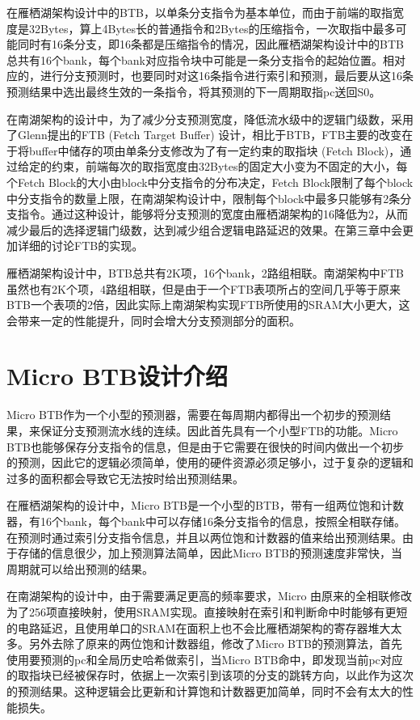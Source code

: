 在雁栖湖架构设计中的BTB，以单条分支指令为基本单位，而由于前端的取指宽度是32Bytes，算上4Bytes长的普通指令和2Bytes的压缩指令，一次取指中最多可能同时有16条分支，即16条都是压缩指令的情况，因此雁栖湖架构设计中的BTB总共有16个bank，每个bank对应指令块中可能是一条分支指令的起始位置。相对应的，进行分支预测时，也要同时对这16条指令进行索引和预测，最后要从这16条预测结果中选出最终生效的一条指令，将其预测的下一周期取指pc送回S0。

在南湖架构的设计中，为了减少分支预测宽度，降低流水级中的逻辑门级数，采用了Glenn提出的FTB (Fetch Target Buffer) 设计\cite{scalable-frontend}，相比于BTB，FTB主要的改变在于将buffer中储存的项由单条分支修改为了有一定约束的取指块 (Fetch Block)，通过给定的约束，前端每次的取指宽度由32Bytes的固定大小变为不固定的大小，每个Fetch Block的大小由block中分支指令的分布决定，Fetch Block限制了每个block中分支指令的数量上限，在南湖架构设计中，限制每个block中最多只能够有2条分支指令。通过这种设计，能够将分支预测的宽度由雁栖湖架构的16降低为2，从而减少最后的选择逻辑门级数，达到减少组合逻辑电路延迟的效果。在第三章中会更加详细的讨论FTB的实现。

雁栖湖架构设计中，BTB总共有2K项，16个bank，2路组相联。南湖架构中FTB虽然也有2K个项，4路组相联，但是由于一个FTB表项所占的空间几乎等于原来BTB一个表项的2倍，因此实际上南湖架构实现FTB所使用的SRAM大小更大，这会带来一定的性能提升，同时会增大分支预测部分的面积。

\section{Micro BTB设计介绍}

Micro BTB作为一个小型的预测器，需要在每周期内都得出一个初步的预测结果，来保证分支预测流水线的连续。因此首先具有一个小型FTB的功能。Micro BTB也能够保存分支指令的信息，但是由于它需要在很快的时间内做出一个初步的预测，因此它的逻辑必须简单，使用的硬件资源必须足够小，过于复杂的逻辑和过多的面积都会导致它无法按时给出预测结果。

在雁栖湖架构的设计中，Micro BTB是一个小型的BTB，带有一组两位饱和计数器，有16个bank，每个bank中可以存储16条分支指令的信息，按照全相联存储。在预测时通过索引分支指令信息，并且以两位饱和计数器的值来给出预测结果。由于存储的信息很少，加上预测算法简单，因此Micro BTB的预测速度非常快，当周期就可以给出预测的结果。

在南湖架构的设计中，由于需要满足更高的频率要求，Micro 由原来的全相联修改为了256项直接映射，使用SRAM实现。直接映射在索引和判断命中时能够有更短的电路延迟，且使用单口的SRAM在面积上也不会比雁栖湖架构的寄存器堆大太多。另外去除了原来的两位饱和计数器组，修改了Micro BTB的预测算法，首先使用要预测的pc和全局历史哈希做索引，当Micro BTB命中，即发现当前pc对应的取指块已经被保存时，依据上一次索引到该项的分支的跳转方向，以此作为这次的预测结果。这种逻辑会比更新和计算饱和计数器更加简单，同时不会有太大的性能损失。

